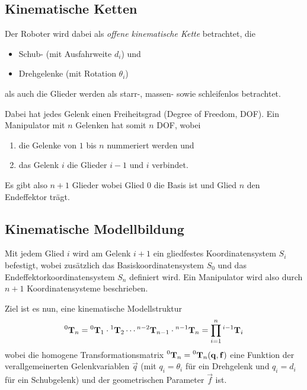 		\subsection{Kinematische Ketten}
			Der Roboter wird dabei als \emph{offene kinematische Kette} betrachtet, \dh die
			\begin{itemize}
				\item Schub- (mit Ausfahrweite \( d_i \)) und
				\item Drehgelenke (mit Rotation \( \theta_i \))
			\end{itemize}
			als auch die Glieder werden als starr-, massen- sowie schleifenlos betrachtet.
			
			Dabei hat jedes Gelenk einen Freiheitsgrad (Degree of Freedom, DOF). Ein Manipulator mit \(n\) Gelenken hat somit \(n\) DOF, wobei
			\begin{enumerate}
				\item die Gelenke von \(1\) bis \(n\) nummeriert werden und
				\item das Gelenk \(i\) die Glieder \(i - 1\) und \(i\) verbindet.
			\end{enumerate}
			Es gibt also \(n + 1\) Glieder wobei Glied \(0\) die Basis ist und Glied \(n\) den Endeffektor trägt.

		\subsection{Kinematische Modellbildung}
			Mit jedem Glied \(i\) wird am Gelenk \(i + 1\) ein gliedfestes Koordinatensystem \(S_i\) befestigt, wobei zusätzlich das Basiskoordinatensystem \(S_0\) und das Endeffektorkoordinatensystem \(S_n\) definiert wird. Ein Manipulator wird also durch \( n + 1 \) Koordinatensysteme beschrieben.
			
			Ziel ist es nun, eine kinematische Modellstruktur
			\begin{equation*}
				\prescript{0}{}{\boldsymbol{\mathrm{T}}}_n = \prescript{0}{}{\boldsymbol{\mathrm{T}}}_1 \cdot \prescript{1}{}{\boldsymbol{\mathrm{T}}}_2 \cdots \prescript{n - 2}{}{\boldsymbol{\mathrm{T}}}_{n - 1} \cdot \prescript{n - 1}{}{\boldsymbol{\mathrm{T}}}_{n} = \prod_{i = 1}^{n} \prescript{i - 1}{}{\boldsymbol{\mathrm{T}}}_i
			\end{equation*}
			wobei die homogene Transformationsmatrix \( \prescript{0}{}{\boldsymbol{\mathrm{T}}}_n = \prescript{0}{}{\boldsymbol{\mathrm{T}}}_n(\boldsymbol{\mathrm{q}}, \boldsymbol{\mathrm{f}}) \) eine Funktion der verallgemeinerten Gelenkvariablen \( \vec{q} \) (mit \( q_i = \theta_i \) für ein Drehgelenk und \( q_i = d_i \) für ein Schubgelenk) und der geometrischen Parameter \( \vec{f} \) ist.

